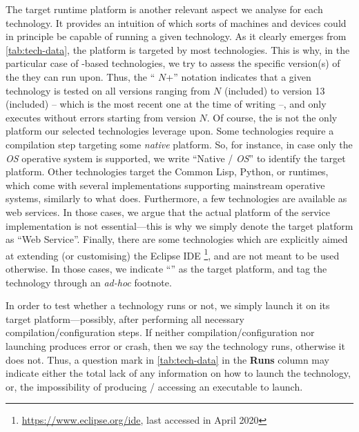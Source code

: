 \documentclass[12pt,a4paper,openright,twoside]{book}
\begin{document}
The target runtime platform is another relevant aspect we analyse for each technology.
%
It provides an intuition of which sorts of machines and devices could in principle be capable of running a given technology.
%
As it clearly emerges from \cref{tab:tech-data}, the \jvm{} platform is targeted by most technologies.
%
This is why, in the particular case of \jvm{}-based technologies, we try to assess the specific version(s) of the \jvm{} they can run upon.
%
Thus, the ``\jvm{} $N$+'' notation indicates that a given technology is tested on all \jvm{} versions ranging from $N$ (included) to version 13 (included) -- which is the most recent one at the time of writing --, and only executes without errors starting from version $N$.
%
Of course, the \jvm{} is not the only platform our selected technologies leverage upon.
%
Some technologies require a compilation step targeting some \emph{native} platform.
%
So, for instance, in case only the \textit{OS} operative system is supported, we write ``Native / \textit{OS}'' to identify the target platform.
%
Other technologies target the Common Lisp, Python, or \erlang{} runtimes, which come with several implementations supporting mainstream operative systems, similarly to what \jvm{} does.
%
%
Furthermore, a few technologies are available as web services.
%
In those cases, we argue that the actual platform of the service implementation is not essential---this is why we simply denote the target platform as ``Web Service''.
%
Finally, there are some technologies which are explicitly aimed at extending (or customising) the Eclipse IDE
\footnote{\url{https://www.eclipse.org/ide}, last accessed in April 2020}, and are not meant to be used otherwise.
%
In those cases, we indicate ``\jvm{}'' as the target platform, and tag the technology through an \emph{ad-hoc} footnote.

In order to test whether a technology runs or not, we simply launch it on its target platform---possibly, after performing all necessary compilation/confi\-guration steps.
%
If neither compilation/configuration nor launching produces error or crash, then we say the technology runs, otherwise it does not.
%
Thus, a question mark in \cref{tab:tech-data} in the \textbf{Runs} column may indicate either the total lack of any information on how to launch the technology, or, the impossibility of producing / accessing an executable to launch.
\end{document}

